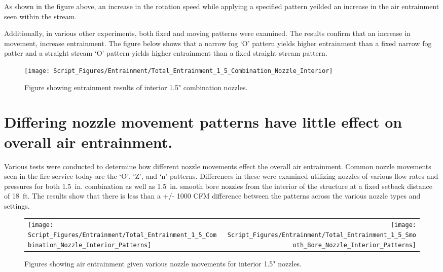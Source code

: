 \documentclass[12pt,oneside]{book}
\begin{document}
As shown in the figure above, an increase in the rotation speed while applying a specified pattern yeilded an increase in the air entrainment seen within the stream.

\clearpage

Additionally, in various other experiments, both fixed and moving patterns were examined. The results confirm that an increase in movement, increase entrainment. The figure below shows that a narrow fog `O' pattern yields higher entrainment than a fixed narrow fog patter and a straight stream `O' pattern yields higher entrainment than a fixed straight stream pattern.

\begin{figure}[!ht]
	\centering
	\texttt{[image: Script\_Figures/Entrainment/Total\_Entrainment\_1\_5\_Combination\_Nozzle\_Interior]}
	\caption{Figure showing entrainment results of interior 1.5" combination nozzles.}
	\label{fig:1_5_Interior_Combination_Results_Nozzle_Movements}
\end{figure}

\clearpage

\section{Differing nozzle movement patterns have little effect on overall air entrainment.} \mbox{}

Various tests were conducted to determine how different nozzle movements effect the overall air entrainment. Common nozzle movements seen in the fire service today are the `O', `Z', and `n' patterns. Differences in these were examined utilizing nozzles of various flow rates and pressures for both 1.5~in. combination as well as 1.5~in. smooth bore nozzles from the interior of the structure at a fixed setback distance of 18~ft. The results show that there is less than a +/- 1000 CFM difference between the patterns across the various nozzle types and settings.

\begin{figure}[!ht]
\begin{tabular*}{\textwidth}{lr}
\texttt{[image: Script\_Figures/Entrainment/Total\_Entrainment\_1\_5\_Combination\_Nozzle\_Interior\_Patterns]} &
\texttt{[image: Script\_Figures/Entrainment/Total\_Entrainment\_1\_5\_Smooth\_Bore\_Nozzle\_Interior\_Patterns]} \\
\end{tabular*}
\caption{Figures showing air entrainment given various nozzle movements for interior 1.5" nozzles.}
\label{fig:1_5_Interior_Nozzle_Movement_Comparison}
\end{figure}
\end{document}
